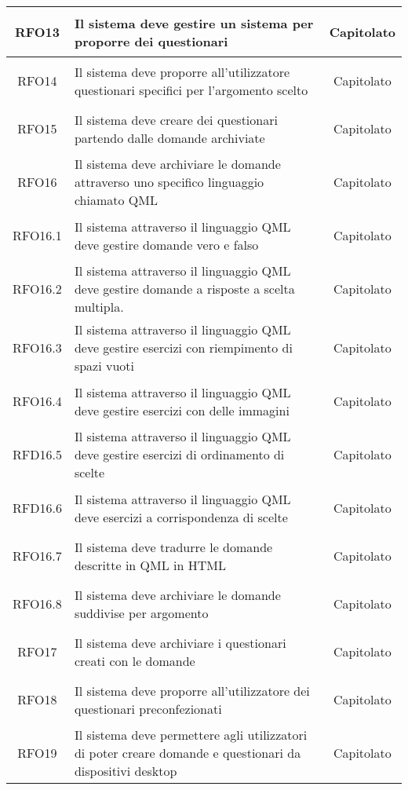 \begin{longtable}{|c|>{\centering}m{7cm}|c|}
		\\ \hline
		\hypertarget{RFO13}{RFO13} & Il sistema deve gestire un sistema per proporre dei questionari & Capitolato
		\\ \hline
		\hypertarget{RFO14}{RFO14} & Il sistema deve proporre all’utilizzatore questionari specifici per l’argomento scelto & Capitolato
		\\ \hline
		\hypertarget{RFO15}{RFO15} & Il sistema deve creare dei questionari partendo dalle domande archiviate & Capitolato
		\\ \hline
		\hypertarget{RFO16}{RFO16} & Il sistema deve archiviare le domande attraverso uno specifico linguaggio chiamato QML & Capitolato
		\\ \hline
		\hypertarget{RFO16.1}{RFO16.1} & Il sistema attraverso il linguaggio QML deve gestire domande vero e falso & Capitolato
		\\ \hline
		\hypertarget{RFO16.2}{RFO16.2} & Il sistema attraverso il linguaggio QML deve gestire domande a risposte a scelta multipla. & Capitolato
		\\ \hline
		\hypertarget{RFO16.3}{RFO16.3} & Il sistema attraverso il linguaggio QML deve gestire esercizi con riempimento di spazi vuoti & Capitolato
		\\ \hline
		\hypertarget{RFO16.4}{RFO16.4} & Il sistema attraverso il linguaggio QML deve gestire esercizi con delle immagini & Capitolato
		\\ \hline
		\hypertarget{RFD16.5}{RFD16.5} & Il sistema attraverso il linguaggio QML deve gestire esercizi di ordinamento di scelte & Capitolato
		\\ \hline
		\hypertarget{RFD16.6}{RFD16.6} & Il sistema attraverso il linguaggio QML deve esercizi a corrispondenza di scelte & Capitolato
		\\ \hline
		\hypertarget{RFO16.7}{RFO16.7} & Il sistema deve tradurre le domande descritte in QML in HTML & Capitolato
		\\ \hline
		\hypertarget{RFO16.8}{RFO16.8} & Il sistema deve archiviare le domande suddivise per argomento & Capitolato
		\\ \hline
		\hypertarget{RFO17}{RFO17} & Il sistema deve archiviare i questionari creati con le domande & Capitolato
		\\ \hline
		\hypertarget{RFO18}{RFO18} & Il sistema deve proporre all’utilizzatore dei questionari preconfezionati & Capitolato
		\\ \hline
		\hypertarget{RFO19}{RFO19} & Il sistema deve permettere agli utilizzatori di poter creare domande e questionari da dispositivi desktop & Capitolato

\end{longtable}
